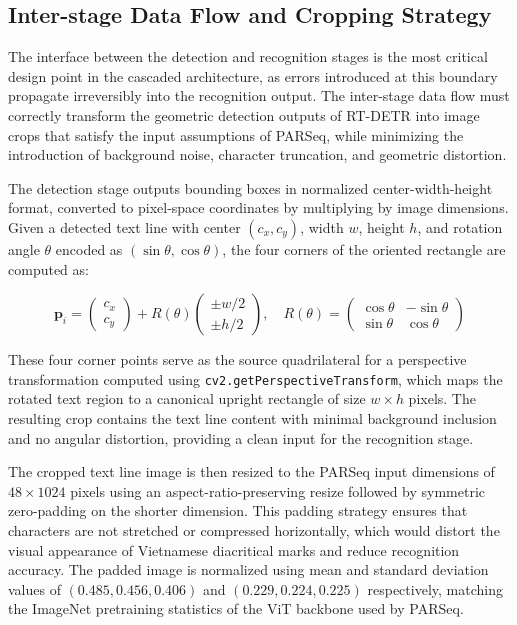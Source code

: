 \subsection{Inter-stage Data Flow and Cropping Strategy}
\label{sec:inter_stage_data_flow_and_cropping_strategy_3_1_2}

The interface between the detection and recognition stages is the most critical design point in the cascaded architecture, as errors introduced at this boundary propagate irreversibly into the recognition output. The inter-stage data flow must correctly transform the geometric detection outputs of RT-DETR into image crops that satisfy the input assumptions of PARSeq, while minimizing the introduction of background noise, character truncation, and geometric distortion.

The detection stage outputs bounding boxes in normalized center-width-height format, converted to pixel-space coordinates by multiplying by image dimensions. Given a detected text line with center $(c_x, c_y)$, width $w$, height $h$, and rotation angle $\theta$ encoded as $(\sin\theta, \cos\theta)$, the four corners of the oriented rectangle are computed as:

\begin{equation}
\mathbf{p}_i = \begin{pmatrix} c_x \\ c_y \end{pmatrix} + R(\theta) \begin{pmatrix} \pm w/2 \\ \pm h/2 \end{pmatrix}, \quad R(\theta) = \begin{pmatrix} \cos\theta & -\sin\theta \\ \sin\theta & \cos\theta \end{pmatrix}
\end{equation}

These four corner points serve as the source quadrilateral for a perspective transformation computed using \texttt{cv2.getPerspectiveTransform}, which maps the rotated text region to a canonical upright rectangle of size $w \times h$ pixels. The resulting crop contains the text line content with minimal background inclusion and no angular distortion, providing a clean input for the recognition stage.

The cropped text line image is then resized to the PARSeq input dimensions of $48 \times 1024$ pixels using an aspect-ratio-preserving resize followed by symmetric zero-padding on the shorter dimension. This padding strategy ensures that characters are not stretched or compressed horizontally, which would distort the visual appearance of Vietnamese diacritical marks and reduce recognition accuracy. The padded image is normalized using mean and standard deviation values of $(0.485, 0.456, 0.406)$ and $(0.229, 0.224, 0.225)$ respectively, matching the ImageNet pretraining statistics of the ViT backbone used by PARSeq.

